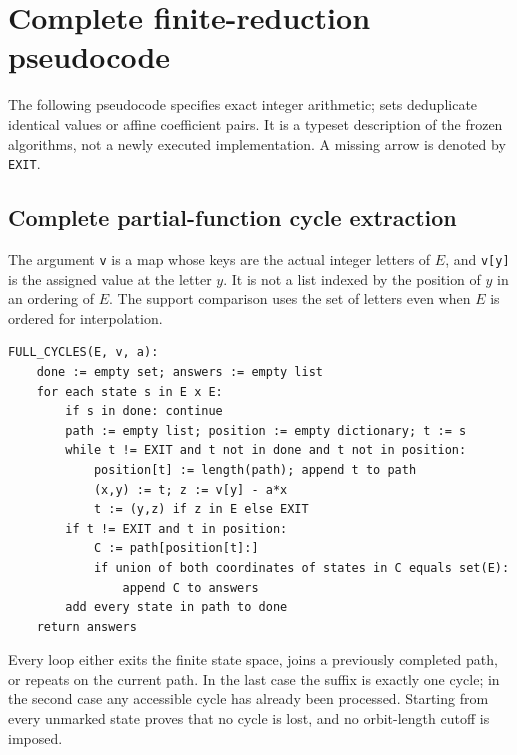 \section{Complete finite-reduction pseudocode}\label{app:pseudocode}

The following pseudocode specifies exact integer arithmetic; sets
deduplicate identical values or affine coefficient pairs. It is a
typeset description of the frozen algorithms, not a newly executed
implementation. A missing arrow is denoted by \texttt{EXIT}.

\subsection{Complete partial-function cycle extraction}
The argument \texttt{v} is a map whose keys are the actual integer
letters of $E$, and \texttt{v[y]} is the assigned value at the letter
$y$. It is not a list indexed by the position of $y$ in an ordering
of $E$. The support comparison uses the set of letters even when
$E$ is ordered for interpolation.
\begin{Verbatim}[fontsize=\small]
FULL_CYCLES(E, v, a):
    done := empty set; answers := empty list
    for each state s in E x E:
        if s in done: continue
        path := empty list; position := empty dictionary; t := s
        while t != EXIT and t not in done and t not in position:
            position[t] := length(path); append t to path
            (x,y) := t; z := v[y] - a*x
            t := (y,z) if z in E else EXIT
        if t != EXIT and t in position:
            C := path[position[t]:]
            if union of both coordinates of states in C equals set(E):
                append C to answers
        add every state in path to done
    return answers
\end{Verbatim}
Every loop either exits the finite state space, joins a previously
completed path, or repeats on the current path. In the last case
the suffix is exactly one cycle; in the second case any accessible
cycle has already been processed. Starting from every unmarked
state proves that no cycle is lost, and no orbit-length cutoff
is imposed.


